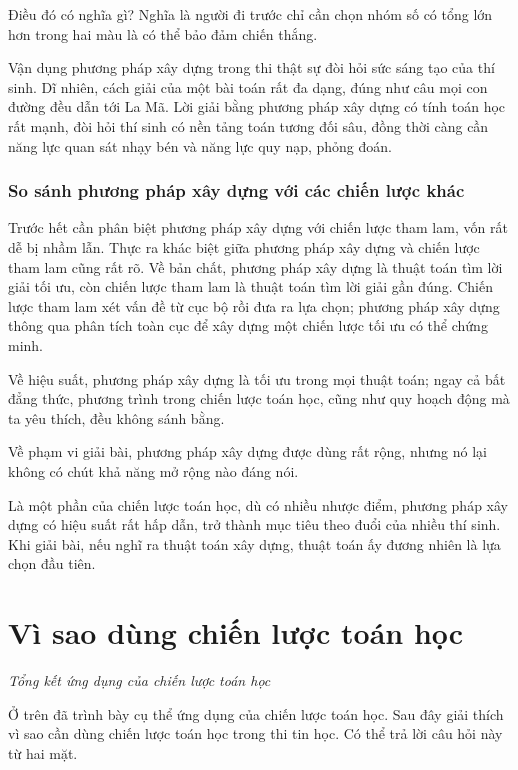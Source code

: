 \documentclass[11pt]{article}
\begin{document}
Điều đó có nghĩa gì? Nghĩa là người đi trước chỉ cần chọn nhóm số có tổng lớn
hơn trong hai màu là có thể bảo đảm chiến thắng.

Vận dụng phương pháp xây dựng trong thi thật sự đòi hỏi sức sáng tạo của thí
sinh. Dĩ nhiên, cách giải của một bài toán rất đa dạng, đúng như câu mọi con
đường đều dẫn tới La Mã. Lời giải bằng phương pháp xây dựng có tính toán học
rất mạnh, đòi hỏi thí sinh có nền tảng toán tương đối sâu, đồng thời càng cần
năng lực quan sát nhạy bén và năng lực quy nạp, phỏng đoán.

\subsubsection{So sánh phương pháp xây dựng với các chiến lược khác}

Trước hết cần phân biệt phương pháp xây dựng với chiến lược tham lam, vốn rất
dễ bị nhầm lẫn. Thực ra khác biệt giữa phương pháp xây dựng và chiến lược
tham lam cũng rất rõ. Về bản chất, phương pháp xây dựng là thuật toán tìm lời
giải tối ưu, còn chiến lược tham lam là thuật toán tìm lời giải gần đúng.
Chiến lược tham lam xét vấn đề từ cục bộ rồi đưa ra lựa chọn; phương pháp xây
dựng thông qua phân tích toàn cục để xây dựng một chiến lược tối ưu có thể
chứng minh.

Về hiệu suất, phương pháp xây dựng là tối ưu trong mọi thuật toán; ngay cả
bất đẳng thức, phương trình trong chiến lược toán học, cũng như quy hoạch
động mà ta yêu thích, đều không sánh bằng.

Về phạm vi giải bài, phương pháp xây dựng được dùng rất rộng, nhưng nó lại
không có chút khả năng mở rộng nào đáng nói.

Là một phần của chiến lược toán học, dù có nhiều nhược điểm, phương pháp xây
dựng có hiệu suất rất hấp dẫn, trở thành mục tiêu theo đuổi của nhiều thí
sinh. Khi giải bài, nếu nghĩ ra thuật toán xây dựng, thuật toán ấy đương
nhiên là lựa chọn đầu tiên.

\section{Vì sao dùng chiến lược toán học}

\begin{center}
\textit{Tổng kết ứng dụng của chiến lược toán học}
\end{center}

Ở trên đã trình bày cụ thể ứng dụng của chiến lược toán học. Sau đây giải
thích vì sao cần dùng chiến lược toán học trong thi tin học. Có thể trả lời
câu hỏi này từ hai mặt.
\end{document}
